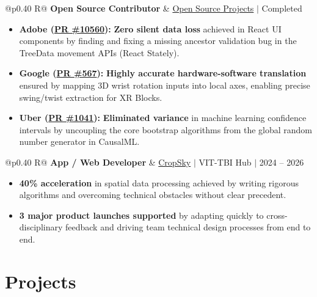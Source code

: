 \documentclass[a4paper,10pt]{article}
\newcommand{\ulink}[2]{\href{#1}{#2}}
\newcommand{\subheading}[1]{{\color[HTML]{0A0A0A}\fontsize{12}{14}\selectfont\bfseries #1}}
\newcommand{\meta}[1]{{\color[HTML]{5C5C5C}\fontsize{10.5}{12.5}\selectfont #1}}
\begin{document}
\begin{tabularx}{\linewidth}{@{}p{0.40\linewidth} R@{}}
\subheading{Open Source Contributor} & \meta{\ulink{https://github.com/su-jin1425/My-Open-Source-Contributions}{Open Source Projects} $|$ Completed}
\end{tabularx}
\begin{itemize}[nosep, leftmargin=1.5em, itemsep=2pt, topsep=2pt]
  \item {\color[HTML]{0A0A0A}\fontsize{11}{14}\selectfont \textbf{Adobe (\ulink{https://github.com/adobe/react-spectrum/pull/10560}{PR \#10560}):} \textbf{Zero silent data loss} achieved in React UI components by finding and fixing a missing ancestor validation bug in the TreeData movement APIs (React Stately).}
  \item {\color[HTML]{0A0A0A}\fontsize{11}{14}\selectfont \textbf{Google (\ulink{https://github.com/google/xrblocks/pull/567}{PR \#567}):} \textbf{Highly accurate hardware-software translation} ensured by mapping 3D wrist rotation inputs into local axes, enabling precise swing/twist extraction for XR Blocks.}
  \item {\color[HTML]{0A0A0A}\fontsize{11}{14}\selectfont \textbf{Uber (\ulink{https://github.com/uber/causalml/pull/1041}{PR \#1041}):} \textbf{Eliminated variance} in machine learning confidence intervals by uncoupling the core bootstrap algorithms from the global random number generator in CausalML.}
\end{itemize}

\begin{tabularx}{\linewidth}{@{}p{0.40\linewidth} R@{}}
\subheading{App / Web Developer} & \meta{\ulink{https://sites.google.com/view/cropsky/home}{CropSky} $|$ VIT-TBI Hub $|$ 2024 -- 2026}
\end{tabularx}
\begin{itemize}[nosep, leftmargin=1.5em, itemsep=2pt, topsep=2pt]
  \item {\color[HTML]{0A0A0A}\fontsize{11}{14}\selectfont \textbf{40\% acceleration} in spatial data processing achieved by writing rigorous algorithms and overcoming technical obstacles without clear precedent.}
  \item {\color[HTML]{0A0A0A}\fontsize{11}{14}\selectfont \textbf{3 major product launches supported} by adapting quickly to cross-disciplinary feedback and driving team technical design processes from end to end.}
\end{itemize}


\section{Projects}
\vspace{2pt}
\end{document}
